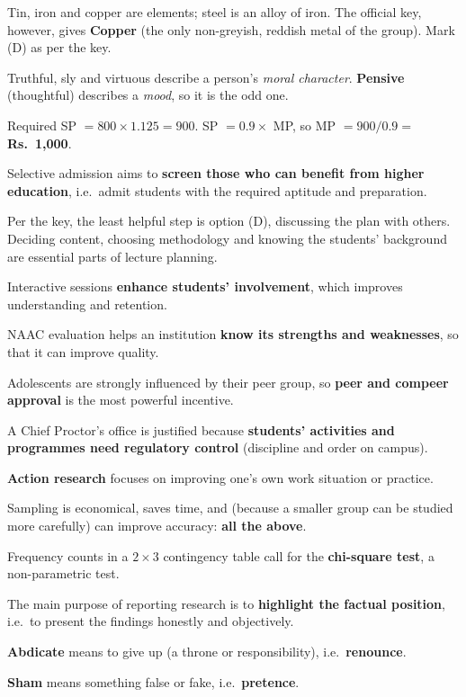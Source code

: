 Tin, iron and copper are elements; steel is an alloy of iron. The official key, however, gives \textbf{Copper} (the only non-greyish, reddish metal of the group). Mark (D) as per the key.

Truthful, sly and virtuous describe a person's \emph{moral character}. \textbf{Pensive} (thoughtful) describes a \emph{mood}, so it is the odd one.

Required SP $=800\times1.125=900$. SP $=0.9\times$ MP, so MP $=900/0.9=$ \textbf{Rs.~1,000}.

Selective admission aims to \textbf{screen those who can benefit from higher education}, i.e.\ admit students with the required aptitude and preparation.

Per the key, the least helpful step is option (D), discussing the plan with others. Deciding content, choosing methodology and knowing the students' background are essential parts of lecture planning.

Interactive sessions \textbf{enhance students' involvement}, which improves understanding and retention.

NAAC evaluation helps an institution \textbf{know its strengths and weaknesses}, so that it can improve quality.

Adolescents are strongly influenced by their peer group, so \textbf{peer and compeer approval} is the most powerful incentive.

A Chief Proctor's office is justified because \textbf{students' activities and programmes need regulatory control} (discipline and order on campus).

\textbf{Action research} focuses on improving one's own work situation or practice.

Sampling is economical, saves time, and (because a smaller group can be studied more carefully) can improve accuracy: \textbf{all the above}.

Frequency counts in a $2\times3$ contingency table call for the \textbf{chi-square test}, a non-parametric test.

The main purpose of reporting research is to \textbf{highlight the factual position}, i.e.\ to present the findings honestly and objectively.

\textbf{Abdicate} means to give up (a throne or responsibility), i.e.\ \textbf{renounce}.

\textbf{Sham} means something false or fake, i.e.\ \textbf{pretence}.

